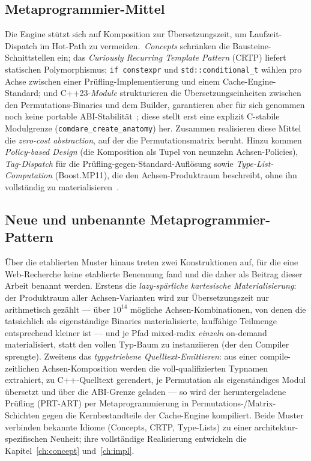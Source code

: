 \subsection{Metaprogrammier-Mittel}\label{ssec:metaprog-facilities}
Die Engine stützt sich auf Komposition zur Übersetzungszeit, um Laufzeit-Dispatch im Hot-Path zu
vermeiden.\ \emph{Concepts} schränken die Bausteine-Schnittstellen ein; das
\emph{Curiously Recurring Template Pattern} (CRTP) liefert statischen Polymorphismus;
\texttt{if~constexpr} und \texttt{std::conditional\_t} wählen pro Achse zwischen einer
Prüfling-Implementierung und einem Cache-Engine-Standard; und C++23-\emph{Module} strukturieren die
Übersetzungseinheiten zwischen den Permutations-Binaries und dem Builder, garantieren aber für sich
genommen noch keine portable ABI-Stabilität~\cite{wg21_modules_abi}; diese stellt erst eine explizit
C-stabile Modulgrenze (\texttt{comdare\_create\_anatomy}) her. Zusammen realisieren diese Mittel die
\emph{zero-cost abstraction}, auf der die Permutationsmatrix beruht. Hinzu kommen
\emph{Policy-based Design} (die Komposition als Tupel von neunzehn Achsen-Policies),
\emph{Tag-Dispatch} für die Prüfling-gegen-Standard-Auflösung sowie \emph{Type-List-Computation}
(Boost.MP11), die den Achsen-Produktraum beschreibt, ohne ihn vollständig zu
materialisieren~\cite{alexandrescu2001modern}.

\subsection{Neue und unbenannte Metaprogrammier-Pattern}\label{ssec:new-patterns}
Über die etablierten Muster hinaus treten zwei Konstruktionen auf, für die eine Web-Recherche keine
etablierte Benennung fand und die daher als Beitrag dieser Arbeit benannt werden. Erstens die
\emph{lazy-spärliche kartesische Materialisierung}: der Produktraum aller Achsen-Varianten wird zur
Übersetzungszeit nur arithmetisch gezählt --- über $10^{14}$ mögliche Achsen-Kombinationen, von
denen die tatsächlich als eigenständige Binaries materialisierte, lauffähige Teilmenge entsprechend
kleiner ist --- und je Pfad mixed-radix \emph{einzeln} on-demand materialisiert, statt den vollen
Typ-Baum zu instanziieren (der den Compiler sprengte). Zweitens das
\emph{typgetriebene Quelltext-Emittieren}: aus einer compile-zeitlichen Achsen-Komposition werden
die voll-qualifizierten Typnamen extrahiert, zu C++-Quelltext gerendert, je Permutation als
eigenständiges Modul übersetzt und über die ABI-Grenze geladen --- so wird der heruntergeladene
Prüfling (PRT-ART) per Metaprogrammierung in Permutations-/Matrix-Schichten gegen die
Kernbestandteile der Cache-Engine kompiliert. Beide Muster verbinden bekannte Idiome (Concepts,
CRTP, Type-Lists) zu einer architektur-spezifischen Neuheit; ihre vollständige Realisierung
entwickeln die Kapitel~\ref{ch:concept} und~\ref{ch:impl}.

